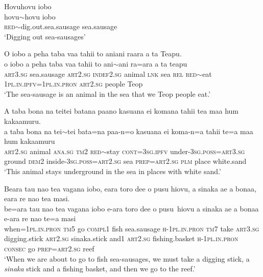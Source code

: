 \ea\label{ex:text32-1}
Hovuhovu iobo\\
\gll hovu{$\sim$}hovu	iobo\\
     \textsc{red}{$\sim$}dig.out.sea.sausage	sea.sausage\\
\glt `Digging out sea-sausages'
\z

\ea\label{ex:text32-2}
O iobo a peha taba vaa tahii to aniani raara a ta Teapu.\\
\gll o	iobo	a	peha	taba	vaa	tahii	to	ani{$\sim$}ani	ra=ara	a	ta	teapu\\
     \textsc{art}3.\textsc{sg}	sea.sausage	\textsc{art}2.\textsc{sg}	\textsc{indef}2.\textsc{sg}	animal	\textsc{lnk}	sea	\textsc{rel}	\textsc{red}{$\sim$}eat	1\textsc{pl}.\textsc{in}.\textsc{ipfv}=1\textsc{pl}.\textsc{in}.\textsc{pron}	\textsc{art}2.\textsc{sg}	people	Teop\\
\glt `The sea-sausage is an animal in the sea that we Teop people eat.'
\z

\ea\label{ex:text32-3}
A taba bona na teitei batana paano kasuana ei komana tahii tea maa hum kakaamuru.\\
\gll a	taba	bona	na	tei{$\sim$}tei	bata=na	paa-n=o	kasuana	ei	koma-n=a	tahii	te=a	maa	hum	kakaamuru\\
     \textsc{art}2.\textsc{sg}	animal	\textsc{ana}.\textsc{sg}	\textsc{tm}2	\textsc{red}{$\sim$}stay	\textsc{cont}=3\textsc{sg}.\textsc{ipfv}	under-3\textsc{sg}.\textsc{poss}=\textsc{art}3.\textsc{sg}	ground	\textsc{dem}2	inside-3\textsc{sg}.\textsc{poss}=\textsc{art}2.\textsc{sg}	sea	\textsc{prep}=\textsc{art}2.\textsc{sg}	\textsc{plm}	place	white.sand\\
\glt `This animal stays underground in the sea in places with white sand.'
\z

\ea\label{ex:text32-4}
Beara tau nao tea vagana iobo, eara toro dee o pusu hiovu, a sinaka ae a bonaa, eara re nao tea masi.\\
\gll be=ara	tau	nao	tea	vagana	iobo	e-ara	toro	dee	o	pusu~hiovu	a	sinaka	ae	a	bonaa	e-ara	re	nao	te=a	masi\\
     when=1\textsc{pl}.\textsc{in}.\textsc{pron}	\textsc{tm}5	go	\textsc{compl}1	fish	sea.sausage	\textsc{h}-1\textsc{pl}.\textsc{in}.\textsc{pron}	\textsc{tm}7	take	\textsc{art}3.\textsc{sg}	digging.stick	\textsc{art}2.\textsc{sg}	sinaka.stick	and1	\textsc{art}2.\textsc{sg}	fishing.basket	\textsc{h}-1\textsc{pl}.\textsc{in}.\textsc{pron}	\textsc{consec}	go	\textsc{prep}=\textsc{art}2.\textsc{sg}	reef\\
\glt `When we are about to go to fish sea-sausages, we must take a digging stick, a \textit{sinaka} stick and a fishing basket, and then we go to the reef.'
\z

